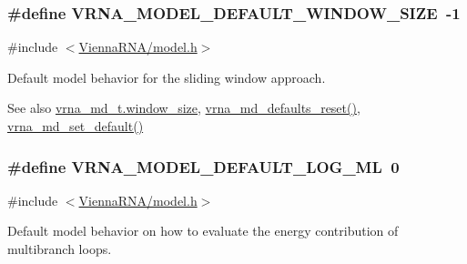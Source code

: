 \subsubsection[{V\+R\+N\+A\+\_\+\+M\+O\+D\+E\+L\+\_\+\+D\+E\+F\+A\+U\+L\+T\+\_\+\+W\+I\+N\+D\+O\+W\+\_\+\+S\+I\+Z\+E}]{\setlength{\rightskip}{0pt plus 5cm}\#define V\+R\+N\+A\+\_\+\+M\+O\+D\+E\+L\+\_\+\+D\+E\+F\+A\+U\+L\+T\+\_\+\+W\+I\+N\+D\+O\+W\+\_\+\+S\+I\+Z\+E~-\/1}\label{group__model__details_ga8de04a9cb57e811e313b0f9f207f6bdb}


{\ttfamily \#include $<$\hyperlink{model_8h}{Vienna\+R\+N\+A/model.\+h}$>$}



Default model behavior for the sliding window approach. 

\begin{DoxySeeAlso}{See also}
\hyperlink{group__model__details_abea42f9229f8d8d6bcbedef316315bfc}{vrna\+\_\+md\+\_\+t.\+window\+\_\+size}, \hyperlink{group__model__details_ga70834424cf804d149937de89f80ceb45}{vrna\+\_\+md\+\_\+defaults\+\_\+reset()}, \hyperlink{group__model__details_ga8ac6ff84936282436f822644bf841f66}{vrna\+\_\+md\+\_\+set\+\_\+default()} 
\end{DoxySeeAlso}
\hypertarget{group__model__details_ga938f68463e84fe060aa6502f428a517d}{}
\subsubsection[{V\+R\+N\+A\+\_\+\+M\+O\+D\+E\+L\+\_\+\+D\+E\+F\+A\+U\+L\+T\+\_\+\+L\+O\+G\+\_\+\+M\+L}]{\setlength{\rightskip}{0pt plus 5cm}\#define V\+R\+N\+A\+\_\+\+M\+O\+D\+E\+L\+\_\+\+D\+E\+F\+A\+U\+L\+T\+\_\+\+L\+O\+G\+\_\+\+M\+L~0}\label{group__model__details_ga938f68463e84fe060aa6502f428a517d}


{\ttfamily \#include $<$\hyperlink{model_8h}{Vienna\+R\+N\+A/model.\+h}$>$}



Default model behavior on how to evaluate the energy contribution of multibranch loops. 

